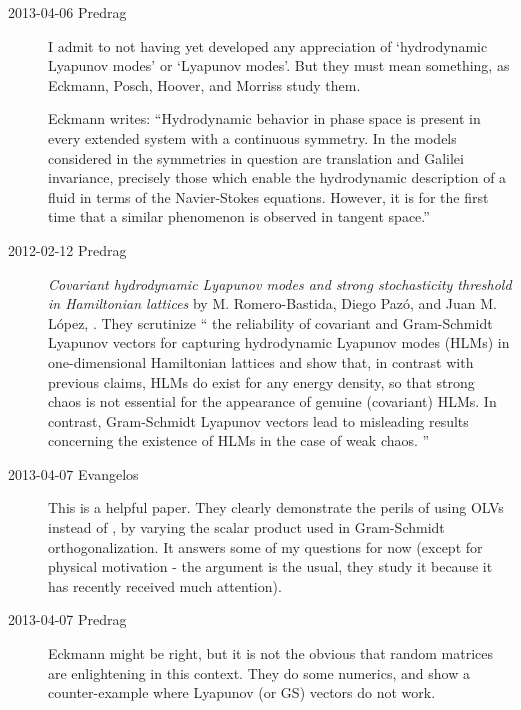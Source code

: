 \begin{description}

\item[2013-04-06 Predrag] I admit to not having yet developed any
appreciation of `hydrodynamic Lyapunov modes' or `Lyapunov modes'.
But they must mean something, as Eckmann,
Posch, 
{Hoover}, and Morriss study them.

Eckmann writes:
``Hydrodynamic behavior in phase space is present in every
extended system with a continuous symmetry. In the models considered
in  the symmetries in question are translation and
Galilei invariance, precisely those which enable the hydrodynamic
description of a fluid in terms of the Navier-Stokes equations.
However, it is for the first time that a similar phenomenon is
observed in tangent space.''

\item[2012-02-12 Predrag]
{\em Covariant hydrodynamic Lyapunov modes and strong stochasticity threshold
 in Hamiltonian lattices}
by M. Romero-Bastida, Diego Paz\'o, and Juan M. L\'opez,
. They scrutinize
``
the reliability of covariant and Gram-Schmidt Lyapunov vectors for
capturing hydrodynamic Lyapunov modes (HLMs) in one-dimensional
Hamiltonian lattices and show that, in contrast with previous claims,
HLMs do exist for any energy density, so that strong chaos is not
essential for the appearance of genuine (covariant) HLMs. In
contrast, Gram-Schmidt Lyapunov vectors lead to misleading results
concerning the existence of HLMs in the case of weak chaos.
''
\item[2013-04-07 Evangelos] This is a helpful paper.
They clearly demonstrate the perils of using OLVs instead of {\cLvs}, by varying the
scalar product used in Gram-Schmidt orthogonalization. It answers some of my questions
for now (except for physical motivation - the argument is the usual, they study
it because it has recently received much attention).

\item[2013-04-07 Predrag] Eckmann might be right,
but it is not the obvious that random matrices are enlightening
in this context. They do some numerics, and show a counter-example
where Lyapunov (or GS) vectors do not work.


\end{description}
